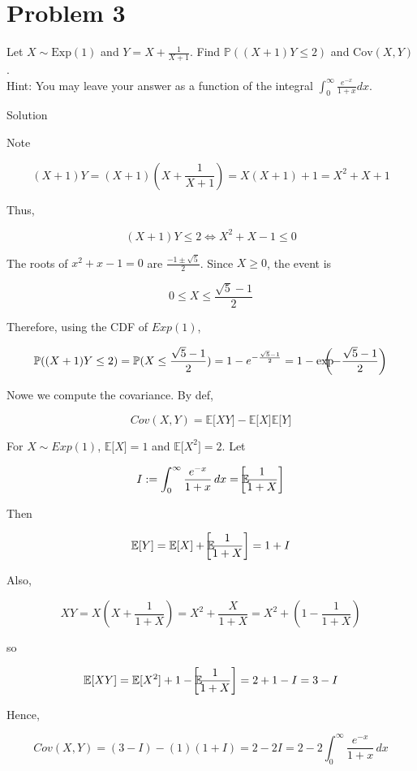 \documentclass{qlnotes-export}
\begin{document}
\section{Problem 3}\label{problem-3-3}

Let \(X \sim \text{Exp}(1)\) and \(Y = X + \frac{1}{X + 1}\). Find \({\mathbb{P}}((X + 1)Y \leq 2)\) and \(\text{Cov}(X,Y)\).\\
Hint: You may leave your answer as a function of the integral \(\int_{0}^{\infty}\frac{e^{- x}}{1 + x}dx\).

\begin{qlsolution}{Solution}

Note

\[(X + 1)Y = (X + 1)\left( {X + \frac{1}{X + 1}} \right) = X(X + 1) + 1 = X^{2} + X + 1\]

Thus,

\[(X + 1)Y \leq 2\Leftrightarrow X^{2} + X - 1 \leq 0\]

The roots of \(x^{2} + x - 1 = 0\) are \(\frac{- 1 \pm \sqrt{5}}{2}\). Since \(X \geq 0\), the event is

\[0 \leq X \leq \frac{\sqrt{5} - 1}{2}\]

Therefore, using the CDF of \(Exp(1)\),

\[{\mathbb{P}}((X + 1)Y \leq 2) = {\mathbb{P}}(X \leq \frac{\sqrt{5} - 1}{2}) = 1 - e^{- \frac{\sqrt{5} - 1}{2}} = 1 - \exp\mspace{-18mu}\left( {- \frac{\sqrt{5} - 1}{2}} \right)\]

Nowe we compute the covariance. By def,

\[Cov(X,Y) = {\mathbb{E}}\lbrack XY\rbrack - {\mathbb{E}}\lbrack X\rbrack{\mathbb{E}}\lbrack Y\rbrack\]

For \(X \sim Exp(1)\), \({\mathbb{E}}\lbrack X\rbrack = 1\) and \({\mathbb{E}}\lbrack X^{2}\rbrack = 2\). Let

\[I := \int_{0}^{\infty}\frac{e^{- x}}{1 + x}\, dx = {\mathbb{E}}\mspace{-18mu}\left\lbrack \frac{1}{1 + X} \right\rbrack\]

Then

\[{\mathbb{E}}\lbrack Y\rbrack = {\mathbb{E}}\lbrack X\rbrack + {\mathbb{E}}\mspace{-18mu}\left\lbrack \frac{1}{1 + X} \right\rbrack = 1 + I\]

Also,

\[XY = X\left( {X + \frac{1}{1 + X}} \right) = X^{2} + \frac{X}{1 + X} = X^{2} + \left( {1 - \frac{1}{1 + X}} \right)\]

so

\[{\mathbb{E}}\lbrack XY\rbrack = {\mathbb{E}}\lbrack X^{2}\rbrack + 1 - {\mathbb{E}}\mspace{-18mu}\left\lbrack \frac{1}{1 + X} \right\rbrack = 2 + 1 - I = 3 - I\]

Hence,

\[Cov(X,Y) = (3 - I) - (1)(1 + I) = 2 - 2I = 2 - 2\int_{0}^{\infty}\frac{e^{- x}}{1 + x}\, dx\]

\end{qlsolution}
\end{document}
